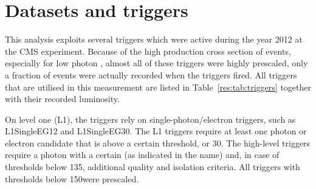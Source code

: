 \section{Datasets and triggers}
\label{res:sec:DatasetsAndTriggers}
This analysis exploits several triggers which were active during the year 2012 at the CMS experiment.
Because of the high production cross section of \GAMJET events, especially for low photon \pt, almost all of these triggers were highly prescaled, \ie only a fraction of events were actually recorded when the triggers fired.
All triggers that are utilised in this measurement are listed in Table~\ref{res:tab:triggers} together with their recorded luminosity.
\renewcommand{\arraystretch}{1.5}
\begin{table}[!b]
\centering
\caption{Single-photon triggers together with the recorded luminosity taking the prescales of the triggers into consideration.}
\label{res:tab:triggers}
\end{table}  
On level one (L1), the triggers rely on single-photon/electron triggers, such as L1SingleEG12 and L1SingleEG30.
The L1 triggers require at least one photon or electron candidate that is above a certain \et threshold, \gev or 30\gev.
The high-level triggers require a photon with a certain \pt (as indicated in the name) and, in case of thresholds below 135\gev, additional quality and isolation criteria. 
All triggers with thresholds below 150\gev were prescaled.

